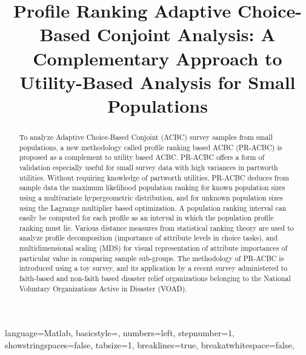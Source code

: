 \documentclass[a4paper, 12pt]{article}
\title {Profile Ranking Adaptive Choice-Based Conjoint Analysis: A Complementary Approach to Utility-Based Analysis for Small Populations}
\author[1]{}
\date{}
\begin{document}
\lstset
{ %
    language=Matlab,
    basicstyle=\scriptsize,
    numbers=left,
    stepnumber=1,
    showstringspaces=false,
    tabsize=1,
    breaklines=true,
    breakatwhitespace=false,
}
\maketitle
\hrulefill



 \vspace{.7in}

 \begin{abstract}
To analyze Adaptive Choice-Based Conjoint (ACBC) survey samples from small populations, a new methodology called profile ranking based ACBC (PR-ACBC) is proposed as a complement to utility based  ACBC. PR-ACBC offers a form of validation especially useful for small survey data with high variances in partworth utilities. Without requiring knowledge of partworth utilities, PR-ACBC deduces from sample data the maximum likelihood population ranking for known population sizes using a multivariate hypergeometric distribution, and for unknown population sizes using the Lagrange multiplier based optimization. A population ranking interval can easily be computed  for each profile as an interval in which the population profile ranking must lie.  Various distance measures from statistical ranking theory are used  to analyze profile decomposition (importance of attribute levels in choice tasks), and   multidimensional scaling (MDS)  for visual representation of attribute importances of particular value in comparing sample sub-groups.  The methodology of PR-ACBC is introduced using a toy survey, and its application  by a recent survey administered to  faith-based and non-faith based disaster relief organizations belonging to the National Voluntary Organizations Active in Disaster (VOAD).

\end{abstract}


\end{document}
